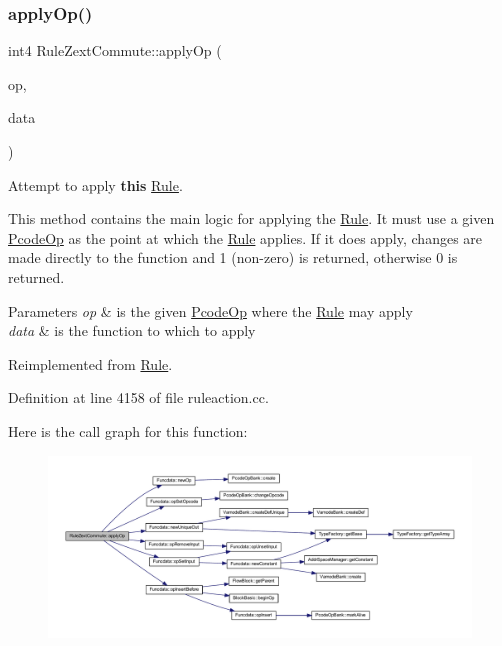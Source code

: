 \subsubsection{\texorpdfstring{applyOp()}{applyOp()}}
{\footnotesize\ttfamily int4 Rule\+Zext\+Commute\+::apply\+Op (\begin{DoxyParamCaption}\item[{\mbox{\hyperlink{class_pcode_op}{Pcode\+Op}} $\ast$}]{op,  }\item[{\mbox{\hyperlink{class_funcdata}{Funcdata}} \&}]{data }\end{DoxyParamCaption})\hspace{0.3cm}{\ttfamily [virtual]}}



Attempt to apply {\bfseries{this}} \mbox{\hyperlink{class_rule}{Rule}}. 

This method contains the main logic for applying the \mbox{\hyperlink{class_rule}{Rule}}. It must use a given \mbox{\hyperlink{class_pcode_op}{Pcode\+Op}} as the point at which the \mbox{\hyperlink{class_rule}{Rule}} applies. If it does apply, changes are made directly to the function and 1 (non-\/zero) is returned, otherwise 0 is returned. 
\begin{DoxyParams}{Parameters}
{\em op} & is the given \mbox{\hyperlink{class_pcode_op}{Pcode\+Op}} where the \mbox{\hyperlink{class_rule}{Rule}} may apply \\
\hline
{\em data} & is the function to which to apply \\
\hline
\end{DoxyParams}


Reimplemented from \mbox{\hyperlink{class_rule_a4e3e61f066670175009f60fb9dc60848}{Rule}}.



Definition at line 4158 of file ruleaction.\+cc.

Here is the call graph for this function\+:
\nopagebreak
\begin{figure}[H]
\begin{center}
\leavevmode
\includegraphics[width=350pt]{class_rule_zext_commute_a04f5c4f8e6cc15d700d777d55c788e81_cgraph}
\end{center}
\end{figure}
\mbox{\label{class_rule_zext_commute_ac52fb507925d6fb14b3138b567dfee6f}} 
